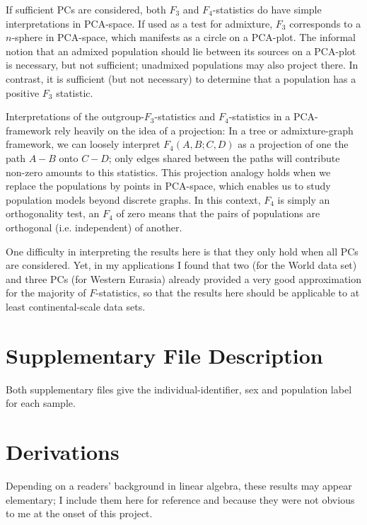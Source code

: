 \documentclass[12pt,fullpage, a4paper]{article}
\begin{document}
If sufficient PCs are considered, both $F_3$ and $F_4$-statistics do have simple interpretations in PCA-space. If used as a test for admixture, $F_3$ corresponds to a $n$-sphere in PCA-space, which manifests as a circle on a PCA-plot. The informal notion that an admixed population should lie between its sources on a PCA-plot is necessary, but not sufficient; unadmixed populations may also project there. In contrast, it is sufficient (but not necessary) to determine that a population has a positive $F_3$ statistic. 

Interpretations of the outgroup-$F_3$-statistics and $F_4$-statistics in a PCA-framework rely heavily on the idea of a projection: In a tree or admixture-graph framework, we can loosely interpret $F_4(A, B; C, D)$ as a projection of one the path $A-B$ onto $C-D$; only edges shared between the paths will contribute non-zero amounts to this statistics. This projection analogy holds when we replace the populations by points in PCA-space, which enables us to study population models beyond discrete graphs. In this context, $F_4$ is simply an orthogonality test, an $F_4$ of zero means that the pairs of populations are orthogonal (i.e. independent) of another. 

One difficulty in interpreting the results here is that they only hold when all PCs are considered. Yet, in my applications I found that two (for the World data set) and three PCs (for Western Eurasia) already provided a very good approximation for the majority of $F$-statistics, so that the results here should be applicable to at least continental-scale data sets.


\section{Supplementary File Description}
Both supplementary files give the individual-identifier, sex and population label for each sample.

%
\printbibliography

\newpage
\appendix
\section{Derivations}\label{appendix:fonpc}
\setcounter{equation}{0}
\renewcommand{\theequation}{\thesection\arabic{equation}}
Depending on a readers' background in linear algebra, these results may appear elementary; I include them here for reference and because they were not obvious to me at the onset of this project.
\end{document}

